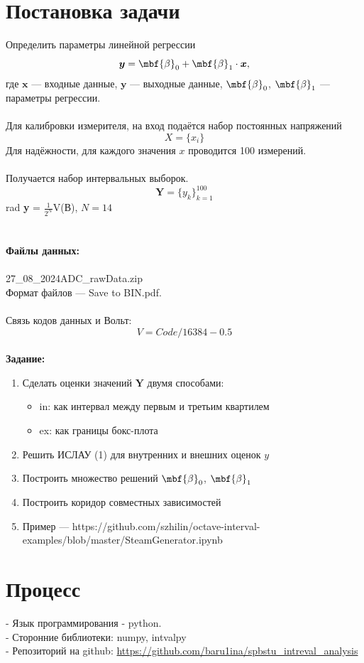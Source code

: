 \documentclass[10pt]{article}
\begin{document}
\section{Постановка задачи}
Определить параметры линейной регрессии
$$\boldsymbol{y} = \mbf{\beta}_0 + \mbf{\beta}_1 \cdot \boldsymbol{x}, $$
где $ \textbf{x}$ --- входные данные, $\textbf{y}$ --- выходные данные, $\mbf{\beta}_0$,  $\mbf{\beta}_1$ --- параметры регрессии.\\\\
Для калибровки измерителя, на вход подаётся набор постоянных
напряжений
$$X = \{x_i\}$$
Для надёжности, для каждого значения $x$ проводится 100 измерений.\\\\
Получается набор интервальных выборок.\\
$$\boldsymbol{Y} = \{y_k\}_{k=1}^{100}$$
rad \textbf{y} = $\frac{1}{2^N}$V(В), $N=14$\\\\
\\\textbf{Файлы данных:}\\\\
27\_08\_2024ADC\_rawData.zip\\
Формат файлов — Save to BIN.pdf.\\\\
Связь кодов данных и Вольт:\\
$$V = Code/16384 − 0.5$$\\
\newpage
\textbf{Задание:}
\begin{enumerate}
    \item Сделать оценки значений $\boldsymbol{Y}$ двумя способами:
        \begin{itemize}
            \item in: как интервал между первым и третьим квартилем
            \item ex: как границы бокс-плота
        \end{itemize}
    \item Решить ИСЛАУ (1) для внутренних и внешних оценок $y$
    \item Построить множество решений $\mbf{\beta}_0$,  $\mbf{\beta}_1$
    \item Построить коридор совместных зависимостей
    \item Пример — https://github.com/szhilin/octave-interval-examples/blob/master/SteamGenerator.ipynb
\end{enumerate}

\section{Процесс}
- Язык программирования - python.\\
- Сторонние библиотеки: numpy, intvalpy \\
- Репозиторий на github: \url{https://github.com/baru1ina/spbstu_intreval_analysis}\\
\newpage
\end{document}
